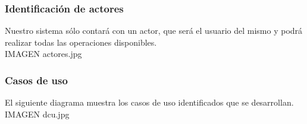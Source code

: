 \documentclass[twoside,a4paper,11pt]{book}
\begin{document}
\subsubsection{Identificación de actores}
Nuestro sistema sólo contará con un actor, que será el usuario del mismo y podrá realizar todas las operaciones disponibles.\\

IMAGEN actores.jpg


\subsubsection{Casos de uso}
El siguiente diagrama muestra los casos de uso identificados que se desarrollan.\\

IMAGEN dcu.jpg
\end{document}
